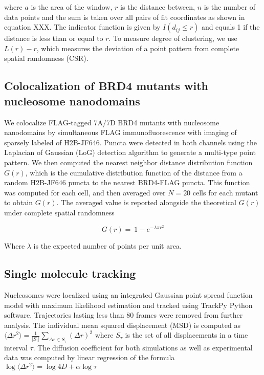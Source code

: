 where $a$ is the area of the window, $r$ is the distance between, $n$ is the number of data points and the sum is taken over all pairs of fit coordinates as shown in equation XXX. The indicator function is given by $I(d_{ij}\le r)$ and equals 1 if the distance is less than or equal to $r$. To measure degree of clustering, we use $L(r)-r$, which measures the deviation of a point pattern from complete spatial randomness (CSR). 

\subsection{Colocalization of BRD4 mutants with nucleosome nanodomains}

We colocalize FLAG-tagged 7A/7D BRD4 mutants with nucleosome nanodomains by simultaneous FLAG immunofluorescence with imaging of sparsely labeled of H2B-JF646. Puncta were detected in both channels using the Laplacian of Gaussian (LoG) detection algorithm to generate a multi-type point pattern. We then computed the nearest neighbor distance distribution function $G(r)$, which is the cumulative distribution function of the distance from a random H2B-JF646 puncta to the nearest BRD4-FLAG puncta. This function was computed for each cell, and then averaged over $N=20$ cells for each mutant to obtain $G(r)$. The averaged value is reported alongside the theoretical $G(r)$ under complete spatial randomness

\begin{equation*}
G(r)=\ 1-e^{-\lambda\pi r^2}
\end{equation*}

Where $\lambda$ is the expected number of points per unit area. 

\subsection{Single molecule tracking}

Nucleosomes were localized using an integrated Gaussian point spread function model with maximum likelihood estimation \parencite{Smith2010,Huang2013} and tracked using TrackPy Python software.  Trajectories lasting less than 80 frames were removed from further analysis. The individual mean squared displacement (MSD) is computed as $\langle \Delta r^{2}\rangle = \frac{1}{\lvert S_{\tau}\lvert}\sum_{\Delta r \in S_{\tau}}(\Delta r)^{2}$
where $S_\tau$ is the set of all displacements in a time interval $\tau$. The diffusion coefficient for both simulations as well as experimental data was computed by linear regression of the formula $\log\langle \Delta r^{2}\rangle  = \log 4D + \alpha \log \tau$

